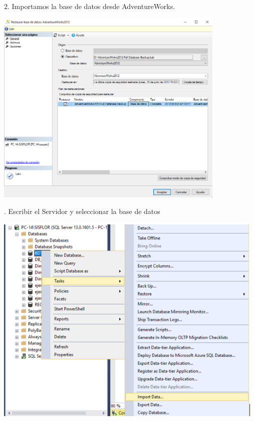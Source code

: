 2.  Importamos la  base de datos desde AdventureWorks.\\
	\begin{center}
	\includegraphics[width=11cm]{./Imagenes/img2}
	\end{center}	
. Escribir el Servidor y seleccionar la base de datos\\
	\begin{center}
	\includegraphics[width=13cm]{./Imagenes/img3}
	\end{center}	

